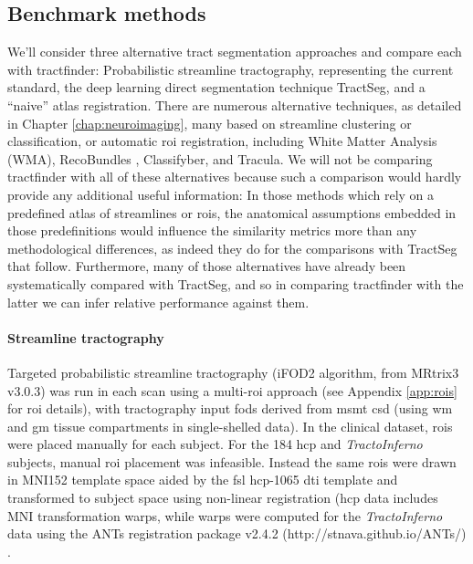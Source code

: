 \documentclass[12pt,phd,a4paper,twoside]{ucl_thesis}
\begin{document}
\subsection{Benchmark methods}
\label{sec:methods}

We'll consider three alternative tract segmentation approaches and compare each with tractfinder: Probabilistic streamline tractography, representing the current standard, the deep learning direct segmentation technique TractSeg, and a ``naive'' atlas registration.
There are numerous alternative techniques, as detailed in Chapter \ref{chap:neuroimaging}, many based on streamline clustering or classification, or automatic \gls{roi} registration, including White Matter Analysis (WMA)\autocite{ODonnell2017}, RecoBundles \autocite{Garyfallidis2018}, Classifyber\autocite{Berto2021}, and Tracula\autocite{Yendiki2011}.
We will not be comparing tractfinder with all of these alternatives because such a comparison would hardly provide any additional useful information:
In those methods which rely on a predefined atlas of streamlines or \glspl{roi}, the anatomical assumptions embedded in those predefinitions would influence the similarity metrics more than any methodological differences, as indeed they do for the comparisons with TractSeg that follow.
Furthermore, many of those alternatives have already been systematically compared with TractSeg\autocite{Wasserthal2018,Berto2021}, and so in comparing tractfinder with the latter we can infer relative performance against them.

\paragraph*{Streamline tractography}

Targeted probabilistic streamline tractography (iFOD2 algorithm\autocite{Tournier2010}, from MRtrix3\autocite{Tournier2019} v3.0.3)  was run in each scan using a multi-\gls{roi} approach (see Appendix \ref{app:rois} for \gls{roi} details),
with tractography input \glspl{fod} derived from \gls{msmt} \gls{csd}\autocite{Jeurissen2014} (using \gls{wm} and \gls{gm} tissue compartments in single-shelled data).
In the clinical dataset, \glspl{roi} were placed manually for each subject.
For the 184 \gls{hcp} and \textit{TractoInferno} subjects, manual \gls{roi} placement was infeasible.
Instead the same \glspl{roi} were drawn in MNI152 template space aided by the \gls{fsl} \gls{hcp}-1065 \gls{dti} template\autocite{FSLATLAS} and transformed to subject space using non-linear registration
(\gls{hcp} data includes MNI transformation warps, while warps were computed for the \textit{TractoInferno} data using the ANTs registration package v2.4.2 (http://stnava.github.io/ANTs/) \autocite{Tustison2013,Avants2011}.
\end{document}
